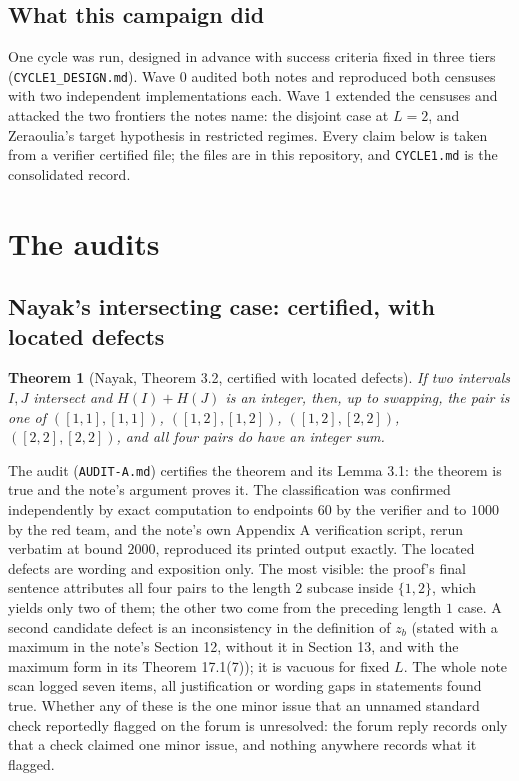 \documentclass[11pt]{article}
\newtheorem{theorem}{Theorem}[section]
\theoremstyle{remark}
\begin{document}
\subsection{What this campaign did}

One cycle was run, designed in advance with success criteria fixed in three tiers (\texttt{CYCLE1\_DESIGN.md}). Wave 0 audited both notes and reproduced both censuses with two independent implementations each. Wave 1 extended the censuses and attacked the two frontiers the notes name: the disjoint case at $L = 2$, and Zeraoulia's target hypothesis in restricted regimes. Every claim below is taken from a verifier certified file; the files are in this repository, and \texttt{CYCLE1.md} is the consolidated record.

\section{The audits}

\subsection{Nayak's intersecting case: certified, with located defects}

\begin{theorem}[Nayak, Theorem 3.2, certified with located defects]
If two intervals $I, J$ intersect and $H(I) + H(J)$ is an integer, then, up to swapping, the pair is one of $([1,1],[1,1])$, $([1,2],[1,2])$, $([1,2],[2,2])$, $([2,2],[2,2])$, and all four pairs do have an integer sum.
\end{theorem}

The audit (\texttt{AUDIT-A.md}) certifies the theorem and its Lemma 3.1: the theorem is true and the note's argument proves it. The classification was confirmed independently by exact computation to endpoints $60$ by the verifier and to $1000$ by the red team, and the note's own Appendix A verification script, rerun verbatim at bound $2000$, reproduced its printed output exactly. The located defects are wording and exposition only. The most visible: the proof's final sentence attributes all four pairs to the length $2$ subcase inside $\{1,2\}$, which yields only two of them; the other two come from the preceding length $1$ case. A second candidate defect is an inconsistency in the definition of $z_b$ (stated with a maximum in the note's Section 12, without it in Section 13, and with the maximum form in its Theorem 17.1(7)); it is vacuous for fixed $L$. The whole note scan logged seven items, all justification or wording gaps in statements found true. Whether any of these is the one minor issue that an unnamed standard check reportedly flagged on the forum is unresolved: the forum reply records only that a check claimed one minor issue, and nothing anywhere records what it flagged.
\end{document}
